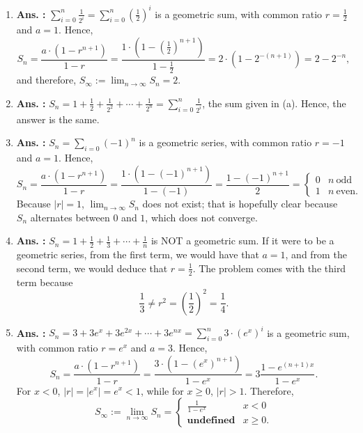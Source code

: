 \begin{enumerate}
\renewcommand{\labelenumi}{(\alph{enumi})}
\setlength{\itemsep}{.2cm}

\item  {\bf Ans. :} $ \sum_{i=0}^n \frac{1}{2^i} =  \sum_{i=0}^n \left(\frac{1}{2} \right)^i $ is a geometric sum, with common ratio $r=\frac{1}{2}$ and $a=1$. Hence, 
$$S_n =  \frac{a \cdot (1 - r^{n+1})}{1 - r} =  \frac{1 \cdot (1 - (\frac{1}{2})^{n+1})}{1 - \frac{1}{2}} =2 \cdot \left( 1 - 2^{-(n+1)}  \right) = 2 - 2^{-n},$$ 
and therefore, $S_\infty := \displaystyle \lim_{n \to \infty} S_n = 2$.


\item  {\bf Ans. :} $S_n = 1 +  \frac{1}{2} + \frac{1}{2^2} + \cdots +\frac{1}{2^n} = \sum_{i=0}^n \frac{1}{2^i}$, the sum given in (a). Hence, the answer is the same.

\item {\bf Ans. :} $S_n = \sum_{i=0} (-1)^n$ is a geometric series, with common ratio $r=-1$ and $a=1$. Hence, 
$$S_n =  \frac{a \cdot (1 - r^{n+1})}{1 - r} =  \frac{1 \cdot (1 - (-1)^{n+1})}{1 - (-1)} = \frac{1 - (-1)^{n+1}}{2} = \begin{cases} 0 & n~\text{odd} \\ 1 & n~\text{even}.\end{cases}$$ 
Because $|r|=1$, $\displaystyle \lim_{n \to \infty} S_n$ does not exist; that is hopefully clear because $S_n$ alternates between $0$ and $1$, which does not converge. 

\item   {\bf Ans. :} $S_n =  1 + \frac{1}{2} + \frac{1}{3} + \cdots +  \frac{1}{n}$ is NOT a geometric sum. If it were to be a geometric series, from the first term, we would have that $a=1$, and from the second term, we would deduce that $r=\frac{1}{2}$. The problem comes with the third term because 
$$\frac{1}{3} \neq r^2 = \left(\frac{1}{2}\right)^2 = \frac{1}{4}.$$

\item  {\bf Ans. :} $S_n =  3 + 3e^{x} + 3e^{2x} + \cdots +  3e^{nx} = \sum_{i=0}^n 3 \cdot \left(e^x \right)^i $ is a geometric sum, with common ratio $r=e^x$ and $a=3$. Hence, 
$$S_n =  \frac{a \cdot (1 - r^{n+1})}{1 - r} =  \frac{3 \cdot (1 - \left(e^{x} \right)^{n+1})}{1 -e^{x}} =3  \frac{1 - e^{(n+1)x}}{1 -e^{x}}.$$ 
For $x < 0$, $|r| = |e^x| = e^x < 1 $, while for $x\ge 0$, $|r|>1$. Therefore,
 $$S_\infty := \displaystyle \lim_{n \to \infty} S_n = \begin{cases}
     \frac{1}{1-e^x} & x < 0\\ \textbf{undefined} & x\ge 0.
 \end{cases} $$


\end{enumerate}
